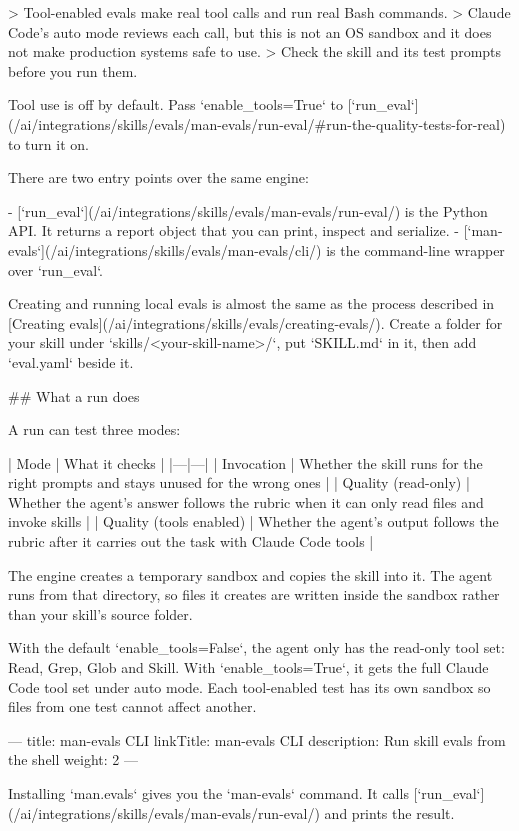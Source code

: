 > Tool-enabled evals make real tool calls and run real Bash commands.
> Claude Code's auto mode reviews each call, but this is not an OS sandbox and it does not make production systems safe to use.
> Check the skill and its test prompts before you run them.

Tool use is off by default.
Pass `enable_tools=True` to [`run_eval`](/ai/integrations/skills/evals/man-evals/run-eval/#run-the-quality-tests-for-real) to turn it on.

There are two entry points over the same engine:

- [`run_eval`](/ai/integrations/skills/evals/man-evals/run-eval/) is the Python API.
  It returns a report object that you can print, inspect and serialize.
- [`man-evals`](/ai/integrations/skills/evals/man-evals/cli/) is the command-line wrapper over `run_eval`.

Creating and running local evals is almost the same as the process described in [Creating evals](/ai/integrations/skills/evals/creating-evals/).
Create a folder for your skill under `skills/<your-skill-name>/`, put `SKILL.md` in it, then add `eval.yaml` beside it.

## What a run does

A run can test three modes:

| Mode | What it checks |
|---|---|
| Invocation | Whether the skill runs for the right prompts and stays unused for the wrong ones |
| Quality (read-only) | Whether the agent's answer follows the rubric when it can only read files and invoke skills |
| Quality (tools enabled) | Whether the agent's output follows the rubric after it carries out the task with Claude Code tools |

The engine creates a temporary sandbox and copies the skill into it.
The agent runs from that directory, so files it creates are written inside the sandbox rather than your skill's source folder.

With the default `enable_tools=False`, the agent only has the read-only tool set: Read, Grep, Glob and Skill.
With `enable_tools=True`, it gets the full Claude Code tool set under auto mode.
Each tool-enabled test has its own sandbox so files from one test cannot affect another.


---
title: man-evals CLI
linkTitle: man-evals CLI
description: Run skill evals from the shell
weight: 2
---

Installing `man.evals` gives you the `man-evals` command.
It calls [`run_eval`](/ai/integrations/skills/evals/man-evals/run-eval/) and prints the result.

